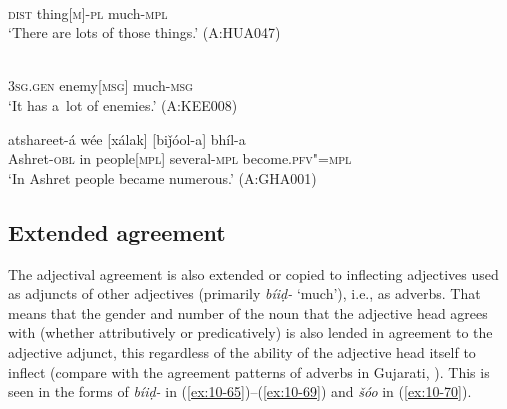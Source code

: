 \begin{exe}
\ex
\label{ex:10-62}
 \\
\textsc{dist} thing[\textsc{m}]-\textsc{pl} much-\textsc{mpl} \\
\glt `There are lots of those things.' (A:HUA047)

\ex
\label{ex:10-63}
 \\
\textsc{3sg.gen} enemy[\textsc{msg}] much-\textsc{msg} \\
\glt `It has a~lot of enemies.' (A:KEE008)

\ex
\label{ex:10-64}
\gll atshareet-á wée [xálak] [biǰóol-a] bhíl-a \\
Ashret-\textsc{obl} in people[\textsc{mpl}] several-\textsc{mpl} become.\textsc{pfv"=mpl} \\
\glt `In Ashret people became numerous.' (A:GHA001)
\end{exe}

\subsection{Extended agreement}
\label{subsec:10-3-4}


The adjectival agreement is also extended or copied to inflecting adjectives used as adjuncts of other adjectives (primarily \textit{bíiḍ-} `much'), i.e., as adverbs. That means that the gender and number of the noun that the adjective head agrees with (whether attributively or predicatively) is also lended in agreement to the adjective adjunct, this regardless of the ability of the adjective head itself to inflect (compare with the agreement patterns of adverbs in Gujarati, \citealt{hookjoshi1991}). This is seen in the forms of \textit{bíiḍ-} in (\ref{ex:10-65})--(\ref{ex:10-69}) and \textit{šóo} in (\ref{ex:10-70}).

